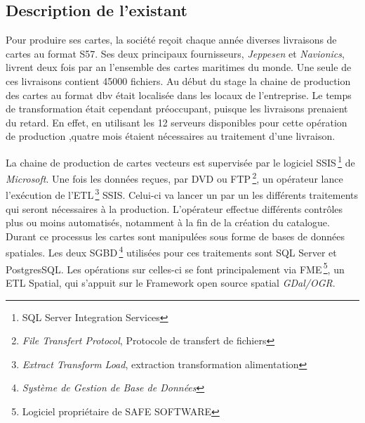 
\subsection{Description de l'existant}
Pour produire ses cartes, la société \maxsea reçoit chaque année
diverses livraisons de cartes au format S57. Ses deux principaux
fournisseurs, \textit{Jeppesen} et \textit{Navionics}, livrent deux
fois par an l'ensemble des cartes maritimes du monde. Une seule de ces
livraisons contient 45000 fichiers. Au début du stage la chaine de
production des cartes au format dbv était localisée dans les locaux de
l'entreprise. Le temps de transformation était cependant préoccupant,
puisque les livraisons prenaient du retard. En effet, en utilisant les
12 serveurs disponibles pour cette opération de production ,quatre
mois étaient nécessaires au traitement d'une livraison.

La chaine de production de cartes vecteurs est supervisée par le
logiciel SSIS\,\footnote{SQL Server Integration Services} de
\textit{Microsoft}. Une fois les données reçues, par DVD ou
FTP\,\footnote{\textit{File Transfert Protocol}, Protocole de
  transfert de fichiers}, un opérateur lance l'exécution de
l'ETL\,\footnote{\textit{Extract Transform Load}, extraction
  transformation alimentation} SSIS. Celui-ci va lancer un par un les
différents traitements qui seront nécessaires à la
production. L'opérateur effectue différents contrôles plus ou moins
automatisés, notamment à la fin de la création du catalogue. Durant ce
processus les cartes sont manipulées sous forme de bases de données
spatiales. Les deux SGBD\,\footnote{\textit{Système de Gestion de Base
    de Données}} utilisées pour ces traitements sont SQL Server et
PostgresSQL. Les opérations sur celles-ci se font principalement via
FME\,\footnote{Logiciel propriétaire de SAFE SOFTWARE}, un ETL
Spatial, qui s'appuit sur le Framework open source spatial
\textit{GDal/OGR}.



